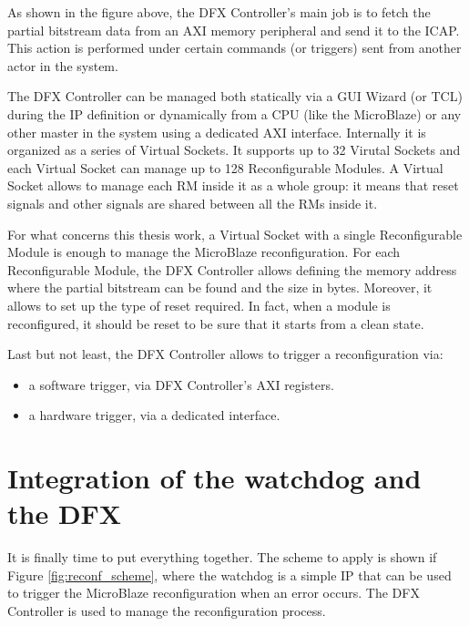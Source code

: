 As shown in the figure above, the DFX Controller's main job is to fetch the partial bitstream data from an AXI memory peripheral and send it to the ICAP. This action is performed under certain commands (or triggers) sent from another actor in the system.\bigskip

The DFX Controller can be managed both statically via a GUI Wizard (or TCL) during the IP definition or dynamically from a CPU (like the MicroBlaze) or any other master in the system using a dedicated AXI interface. Internally it is organized as a series of Virtual Sockets. It supports up to 32 Virutal Sockets and each Virtual Socket can manage up to 128 Reconfigurable Modules. A Virtual Socket allows to manage each RM inside it as a whole group: it means that reset signals and other signals are shared between all the RMs inside it. \bigskip

For what concerns this thesis work, a Virtual Socket with a single Reconfigurable Module is enough to manage the MicroBlaze reconfiguration. For each Reconfigurable Module, the DFX Controller allows defining the memory address where the partial bitstream can be found and the size in bytes. Moreover, it allows to set up the type of reset required. In fact, when a module is reconfigured, it should be reset to be sure that it starts from a clean state. \bigskip

Last but not least, the DFX Controller allows to trigger a reconfiguration via:
\begin{itemize}
    \item a software trigger, via DFX Controller's AXI registers.
    \item a hardware trigger, via a dedicated interface.
\end{itemize}

\section{Integration of the watchdog and the DFX}
It is finally time to put everything together. The scheme to apply is shown if Figure \ref{fig:reconf_scheme}, where the watchdog is a simple IP that can be used to trigger the MicroBlaze reconfiguration when an error occurs. The DFX Controller is used to manage the reconfiguration process. 

